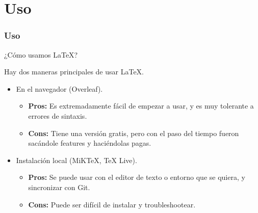 \section{Uso}\label{sec:uso}

\begin{frame}
\frametitle{Uso}
    \begin{tcolorbox}[colframe=color1]
        \begin{center}
            ¿Cómo usamos \LaTeX ?
        \end{center}
    \end{tcolorbox}

    Hay dos maneras principales de usar \LaTeX{}. 
    \begin{itemize}
        \item En el navegador (Overleaf).
        \begin{itemize}
            \item \textbf{Pros:} Es extremadamente fácil de empezar a usar, y es muy tolerante a errores de sintaxis.
            \item \textbf{Cons:} Tiene una versión gratis, pero con el paso del tiempo fueron sacándole features y haciéndolas pagas.
        \end{itemize}
        \item Instalación local (MiKTeX, TeX Live).
        \begin{itemize}
            \item \textbf{Pros:} Se puede usar con el editor de texto o entorno que se quiera, y sincronizar con Git.
            \item \textbf{Cons:} Puede ser difícil de instalar y troubleshootear.
        \end{itemize}
        
    \end{itemize}

    
    
\end{frame}

